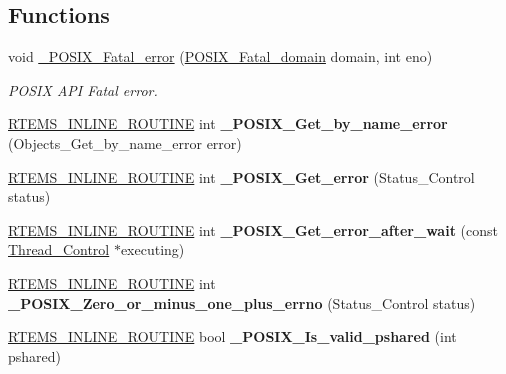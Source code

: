 \subsection*{Functions}
\begin{DoxyCompactItemize}
\item 
void \mbox{\hyperlink{group__POSIXAPI_ga32fb275aa51c0b00afe995ed45ec7cd3}{\+\_\+\+P\+O\+S\+I\+X\+\_\+\+Fatal\+\_\+error}} (\mbox{\hyperlink{group__POSIXAPI_gaac30333ed4742bd2355e87a0cf4461e4}{P\+O\+S\+I\+X\+\_\+\+Fatal\+\_\+domain}} domain, int eno)
\begin{DoxyCompactList}\small\item\em P\+O\+S\+IX A\+PI Fatal error. \end{DoxyCompactList}\item 
\mbox{\label{group__POSIXAPI_ga0bb123f1bd8deadb0762742094213392}} 
\mbox{\hyperlink{group__RTEMSScoreBaseDefs_gac216239df231d5dbd15e3520b0b9313f}{R\+T\+E\+M\+S\+\_\+\+I\+N\+L\+I\+N\+E\+\_\+\+R\+O\+U\+T\+I\+NE}} int {\bfseries \+\_\+\+P\+O\+S\+I\+X\+\_\+\+Get\+\_\+by\+\_\+name\+\_\+error} (Objects\+\_\+\+Get\+\_\+by\+\_\+name\+\_\+error error)
\item 
\mbox{\label{group__POSIXAPI_gaa1119843a0059557617e59c57d129d37}} 
\mbox{\hyperlink{group__RTEMSScoreBaseDefs_gac216239df231d5dbd15e3520b0b9313f}{R\+T\+E\+M\+S\+\_\+\+I\+N\+L\+I\+N\+E\+\_\+\+R\+O\+U\+T\+I\+NE}} int {\bfseries \+\_\+\+P\+O\+S\+I\+X\+\_\+\+Get\+\_\+error} (Status\+\_\+\+Control status)
\item 
\mbox{\label{group__POSIXAPI_gaaab167af73ac1c9fa44bf3975c5d39d1}} 
\mbox{\hyperlink{group__RTEMSScoreBaseDefs_gac216239df231d5dbd15e3520b0b9313f}{R\+T\+E\+M\+S\+\_\+\+I\+N\+L\+I\+N\+E\+\_\+\+R\+O\+U\+T\+I\+NE}} int {\bfseries \+\_\+\+P\+O\+S\+I\+X\+\_\+\+Get\+\_\+error\+\_\+after\+\_\+wait} (const \mbox{\hyperlink{struct__Thread__Control}{Thread\+\_\+\+Control}} $\ast$executing)
\item 
\mbox{\label{group__POSIXAPI_gaf1c895aa28e4787b238b60df9642b08e}} 
\mbox{\hyperlink{group__RTEMSScoreBaseDefs_gac216239df231d5dbd15e3520b0b9313f}{R\+T\+E\+M\+S\+\_\+\+I\+N\+L\+I\+N\+E\+\_\+\+R\+O\+U\+T\+I\+NE}} int {\bfseries \+\_\+\+P\+O\+S\+I\+X\+\_\+\+Zero\+\_\+or\+\_\+minus\+\_\+one\+\_\+plus\+\_\+errno} (Status\+\_\+\+Control status)
\item 
\mbox{\label{group__POSIXAPI_gad05fb937466662bdf76ca576d1e3dc2b}} 
\mbox{\hyperlink{group__RTEMSScoreBaseDefs_gac216239df231d5dbd15e3520b0b9313f}{R\+T\+E\+M\+S\+\_\+\+I\+N\+L\+I\+N\+E\+\_\+\+R\+O\+U\+T\+I\+NE}} bool {\bfseries \+\_\+\+P\+O\+S\+I\+X\+\_\+\+Is\+\_\+valid\+\_\+pshared} (int pshared)
\end{DoxyCompactItemize}

